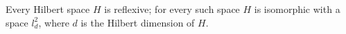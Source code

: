 Every Hilbert space $H$ is reflexive; for every such space $H$ is isomorphic with a space $l_d^2$, where $d$ is the Hilbert dimension of $H$.

